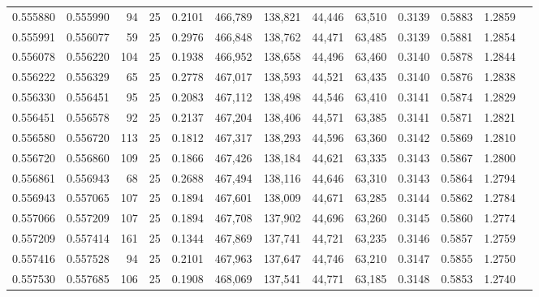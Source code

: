 \begin{tabular}{rrrrrrrrrrrrr}
0.555880 & 0.555990 &    94 &  25 &                                     0.2101 & 466,789 & 138,821 &  44,446 &  63,510 & 0.3139 & 0.5883 & 1.2859 \\
0.555991 & 0.556077 &    59 &  25 &                                     0.2976 & 466,848 & 138,762 &  44,471 &  63,485 & 0.3139 & 0.5881 & 1.2854 \\
0.556078 & 0.556220 &   104 &  25 &                                     0.1938 & 466,952 & 138,658 &  44,496 &  63,460 & 0.3140 & 0.5878 & 1.2844 \\
0.556222 & 0.556329 &    65 &  25 &                                     0.2778 & 467,017 & 138,593 &  44,521 &  63,435 & 0.3140 & 0.5876 & 1.2838 \\
0.556330 & 0.556451 &    95 &  25 &                                     0.2083 & 467,112 & 138,498 &  44,546 &  63,410 & 0.3141 & 0.5874 & 1.2829 \\
0.556451 & 0.556578 &    92 &  25 &                                     0.2137 & 467,204 & 138,406 &  44,571 &  63,385 & 0.3141 & 0.5871 & 1.2821 \\
0.556580 & 0.556720 &   113 &  25 &                                     0.1812 & 467,317 & 138,293 &  44,596 &  63,360 & 0.3142 & 0.5869 & 1.2810 \\
0.556720 & 0.556860 &   109 &  25 &                                     0.1866 & 467,426 & 138,184 &  44,621 &  63,335 & 0.3143 & 0.5867 & 1.2800 \\
0.556861 & 0.556943 &    68 &  25 &                                     0.2688 & 467,494 & 138,116 &  44,646 &  63,310 & 0.3143 & 0.5864 & 1.2794 \\
0.556943 & 0.557065 &   107 &  25 &                                     0.1894 & 467,601 & 138,009 &  44,671 &  63,285 & 0.3144 & 0.5862 & 1.2784 \\
0.557066 & 0.557209 &   107 &  25 &                                     0.1894 & 467,708 & 137,902 &  44,696 &  63,260 & 0.3145 & 0.5860 & 1.2774 \\
0.557209 & 0.557414 &   161 &  25 &                                     0.1344 & 467,869 & 137,741 &  44,721 &  63,235 & 0.3146 & 0.5857 & 1.2759 \\
0.557416 & 0.557528 &    94 &  25 &                                     0.2101 & 467,963 & 137,647 &  44,746 &  63,210 & 0.3147 & 0.5855 & 1.2750 \\
0.557530 & 0.557685 &   106 &  25 &                                     0.1908 & 468,069 & 137,541 &  44,771 &  63,185 & 0.3148 & 0.5853 & 1.2740 \\

\end{tabular}
